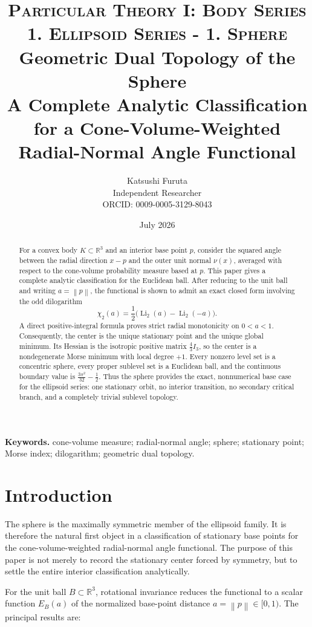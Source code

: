 \documentclass[11pt]{article}
\title{\small\textsc{Particular Theory I: Body Series}\\
\textsc{1. Ellipsoid Series - 1. Sphere}\\[1.2em]
\LARGE\textbf{Geometric Dual Topology of the Sphere}\\[0.4em]
\large A Complete Analytic Classification for a Cone-Volume-Weighted Radial-Normal Angle Functional}
\author{Katsushi Furuta\\
\small Independent Researcher\\
\small ORCID: 0009-0005-3129-8043}
\date{July 2026}
\theoremstyle{definition}
\newcommand{\R}{\mathbb{R}}
\newcommand{\Li}{\operatorname{Li}}
\newcommand{\norm}[1]{\left\lVert #1\right\rVert}
\begin{document}
\maketitle

\begin{abstract}
For a convex body $K\subset\R^3$ and an interior base point $p$, consider the squared angle between the radial direction $x-p$ and the outer unit normal $\nu(x)$, averaged with respect to the cone-volume probability measure based at $p$.  This paper gives a complete analytic classification for the Euclidean ball.  After reducing to the unit ball and writing $a=\norm p$, the functional is shown to admit an exact closed form involving the odd dilogarithm
\[
\chi_2(a)=\frac12\bigl(\Li_2(a)-\Li_2(-a)\bigr).
\]
A direct positive-integral formula proves strict radial monotonicity on $0<a<1$.  Consequently, the center is the unique stationary point and the unique global minimum.  Its Hessian is the isotropic positive matrix $\frac43 I_3$, so the center is a nondegenerate Morse minimum with local degree $+1$.  Every nonzero level set is a concentric sphere, every proper sublevel set is a Euclidean ball, and the continuous boundary value is $\frac{3\pi^2}{32}-\frac12$.  Thus the sphere provides the exact, nonnumerical base case for the ellipsoid series: one stationary orbit, no interior transition, no secondary critical branch, and a completely trivial sublevel topology.
\end{abstract}

\noindent\textbf{Keywords.}
cone-volume measure; radial-normal angle; sphere; stationary point; Morse index; dilogarithm; geometric dual topology.

\section{Introduction}

The sphere is the maximally symmetric member of the ellipsoid family.  It is therefore the natural first object in a classification of stationary base points for the cone-volume-weighted radial-normal angle functional.  The purpose of this paper is not merely to record the stationary center forced by symmetry, but to settle the entire interior classification analytically.

For the unit ball $B\subset\R^3$, rotational invariance reduces the functional to a scalar function $E_B(a)$ of the normalized base-point distance $a=\norm p\in[0,1)$.  The principal results are:
\end{document}
